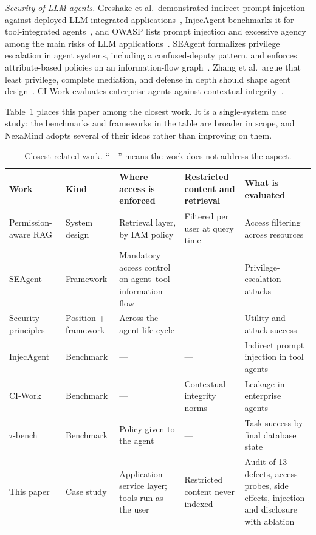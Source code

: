 \documentclass[conference]{IEEEtran}
\begin{document}
\textit{Security of LLM agents.} Greshake et al.\ demonstrated indirect prompt injection against deployed LLM-integrated applications~\cite{greshake2023indirect}, InjecAgent benchmarks it for tool-integrated agents~\cite{zhan2024injecagent}, and OWASP lists prompt injection and excessive agency among the main risks of LLM applications~\cite{owasp2025llm}. SEAgent formalizes privilege escalation in agent systems, including a confused-deputy pattern, and enforces attribute-based policies on an information-flow graph~\cite{ji2026seagent}. Zhang et al.\ argue that least privilege, complete mediation, and defense in depth should shape agent design~\cite{zhang2025principles}. CI-Work evaluates enterprise agents against contextual integrity~\cite{fu2026ciwork}.

Table~\ref{tab:related} places this paper among the closest work. It is a single-system case study; the benchmarks and frameworks in the table are broader in scope, and NexaMind adopts several of their ideas rather than improving on them.

\begin{table}[t]
\centering
\caption{Closest related work. ``---'' means the work does not address the aspect.}
\label{tab:related}
\small
\begin{tabular}{@{}p{2.6cm}p{2.0cm}p{3.4cm}p{3.4cm}p{4.2cm}@{}}
\toprule
Work & Kind & Where access is enforced & Restricted content and retrieval & What is evaluated \\
\midrule
Permission-aware RAG~\cite{jeong2025permission} & System design & Retrieval layer, by IAM policy & Filtered per user at query time & Access filtering across resources \\
SEAgent~\cite{ji2026seagent} & Framework & Mandatory access control on agent--tool information flow & --- & Privilege-escalation attacks \\
Security principles~\cite{zhang2025principles} & Position + framework & Across the agent life cycle & --- & Utility and attack success \\
InjecAgent~\cite{zhan2024injecagent} & Benchmark & --- & --- & Indirect prompt injection in tool agents \\
CI-Work~\cite{fu2026ciwork} & Benchmark & --- & Contextual-integrity norms & Leakage in enterprise agents \\
$\tau$-bench~\cite{yao2024taubench} & Benchmark & Policy given to the agent & --- & Task success by final database state \\
\midrule
This paper & Case study & Application service layer; tools run as the user & Restricted content never indexed & Audit of 13 defects, access probes, side effects, injection and disclosure with ablation \\
\bottomrule
\end{tabular}
\end{table}
\end{document}
